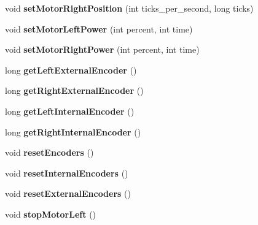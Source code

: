 \begin{DoxyCompactItemize}
void {\bfseries set\+Motor\+Right\+Position} (int ticks\+\_\+per\+\_\+second, long ticks)
\item 
\mbox{\label{classAsservDriver__LegoAngle_a51a665cf0aafd4df6f0261d35191232d}} 
void {\bfseries set\+Motor\+Left\+Power} (int percent, int time)
\item 
\mbox{\label{classAsservDriver__LegoAngle_a62df210c4851a8ae4ad15cb0cf435296}} 
void {\bfseries set\+Motor\+Right\+Power} (int percent, int time)
\item 
\mbox{\label{classAsservDriver__LegoAngle_a335053b05cdfe22a6f91d16127b3a518}} 
long {\bfseries get\+Left\+External\+Encoder} ()
\item 
\mbox{\label{classAsservDriver__LegoAngle_ac911fb65ccc3b066b0a5d305a9525c3e}} 
long {\bfseries get\+Right\+External\+Encoder} ()
\item 
\mbox{\label{classAsservDriver__LegoAngle_a71700c68b11121730e2b971762da1172}} 
long {\bfseries get\+Left\+Internal\+Encoder} ()
\item 
\mbox{\label{classAsservDriver__LegoAngle_ae57550d431d527c8ba35e413c2a865b3}} 
long {\bfseries get\+Right\+Internal\+Encoder} ()
\item 
\mbox{\label{classAsservDriver__LegoAngle_ae1a750e56ba2eae46b20fa9d7b1ae470}} 
void {\bfseries reset\+Encoders} ()
\item 
\mbox{\label{classAsservDriver__LegoAngle_a0afb675f0b661d618ced0c73b6b1a533}} 
void {\bfseries reset\+Internal\+Encoders} ()
\item 
\mbox{\label{classAsservDriver__LegoAngle_aeabc5021ff905240ec529721007256d2}} 
void {\bfseries reset\+External\+Encoders} ()
\item 
\mbox{\label{classAsservDriver__LegoAngle_ae3f4d91357e2a48d153ac26d995f2d68}} 
void {\bfseries stop\+Motor\+Left} ()

\end{DoxyCompactItemize}
